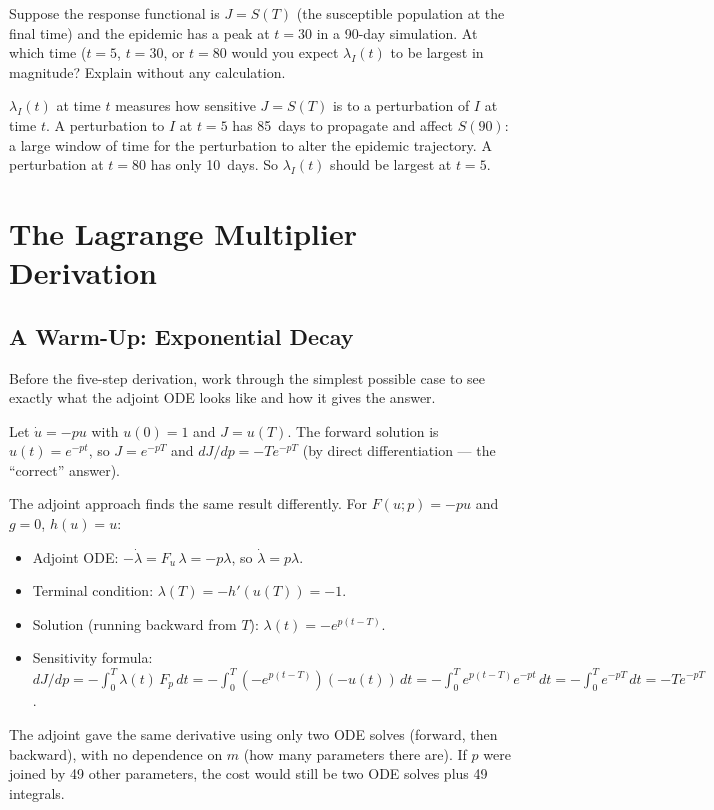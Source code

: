 \begin{selfcheck}
Suppose the response functional is $J = S(T)$ (the susceptible
population at the final time) and the epidemic has a peak at $t = 30$
in a 90-day simulation. At which time ($t = 5$, $t = 30$, or $t = 80$
would you expect $\lambda_I(t)$ to be largest in magnitude?
Explain without any calculation.
\end{selfcheck}
\begin{scAnswer}
$\lambda_I(t)$ at time $t$ measures how sensitive $J = S(T)$ is to a
perturbation of $I$ at time $t$. A perturbation to $I$ at $t = 5$
has 85~days to propagate and affect $S(90)$: a large window
of time for the perturbation to alter the epidemic trajectory.
A perturbation at $t = 80$ has only 10~days.
So $\lambda_I(t)$ should be largest at $t = 5$.
\end{scAnswer}

\section{The Lagrange Multiplier Derivation}
\label{sec:lagrange}

\subsection{A Warm-Up: Exponential Decay}

Before the five-step derivation, work through the simplest possible case
to see exactly what the adjoint ODE looks like and how it gives the answer.

Let $\dot{u} = -pu$ with $u(0) = 1$ and $J = u(T)$.
The forward solution is $u(t) = e^{-pt}$, so $J = e^{-pT}$ and
$dJ/dp = -T e^{-pT}$ (by direct differentiation --- the ``correct'' answer).

The adjoint approach finds the same result differently.
For $F(u;p) = -pu$ and $g = 0$, $h(u) = u$:
\begin{itemize}[nosep]
  \item Adjoint ODE: $-\dot{\lambda} = F_u\,\lambda = -p\lambda$,
        so $\dot{\lambda} = p\lambda$.
  \item Terminal condition: $\lambda(T) = -h'(u(T)) = -1$.
  \item Solution (running backward from $T$): $\lambda(t) = -e^{p(t-T)}$.
  \item Sensitivity formula: $dJ/dp = -\int_0^T \lambda(t)\,F_p\,dt
        = -\int_0^T (-e^{p(t-T)})(-u(t))\,dt
        = -\int_0^T e^{p(t-T)}e^{-pt}\,dt
        = -\int_0^T e^{-pT}\,dt = -Te^{-pT}$. \checkmark
\end{itemize}
The adjoint gave the same derivative using only two ODE solves (forward,
then backward), with no dependence on $m$ (how many parameters there are).
If $p$ were joined by 49 other parameters, the cost would still be
two ODE solves plus 49 integrals.

